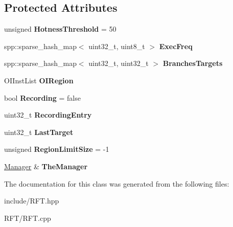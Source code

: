 \subsection*{Protected Attributes}
\begin{DoxyCompactItemize}
\item 
unsigned {\bfseries Hotness\+Threshold} = 50\hypertarget{classdbt_1_1_r_f_t_a03facc8b4254fa669d60ce76577aabb5}{}\label{classdbt_1_1_r_f_t_a03facc8b4254fa669d60ce76577aabb5}

\item 
spp\+::sparse\+\_\+hash\+\_\+map$<$ uint32\+\_\+t, uint8\+\_\+t $>$ {\bfseries Exec\+Freq}\hypertarget{classdbt_1_1_r_f_t_a0002b19ea0428e5b620b700f7d68e6e7}{}\label{classdbt_1_1_r_f_t_a0002b19ea0428e5b620b700f7d68e6e7}

\item 
spp\+::sparse\+\_\+hash\+\_\+map$<$ uint32\+\_\+t, uint32\+\_\+t $>$ {\bfseries Branches\+Targets}\hypertarget{classdbt_1_1_r_f_t_a7554ac4d22167967f3cefca30f7eea32}{}\label{classdbt_1_1_r_f_t_a7554ac4d22167967f3cefca30f7eea32}

\item 
O\+I\+Inst\+List {\bfseries O\+I\+Region}\hypertarget{classdbt_1_1_r_f_t_a343b0402924fbc86768e754bfbee3ade}{}\label{classdbt_1_1_r_f_t_a343b0402924fbc86768e754bfbee3ade}

\item 
bool {\bfseries Recording} = false\hypertarget{classdbt_1_1_r_f_t_a2b40bb36d8fd5f7b383ee7c1108ea604}{}\label{classdbt_1_1_r_f_t_a2b40bb36d8fd5f7b383ee7c1108ea604}

\item 
uint32\+\_\+t {\bfseries Recording\+Entry}\hypertarget{classdbt_1_1_r_f_t_aa64122cac618590fcd7d7ed727956972}{}\label{classdbt_1_1_r_f_t_aa64122cac618590fcd7d7ed727956972}

\item 
uint32\+\_\+t {\bfseries Last\+Target}\hypertarget{classdbt_1_1_r_f_t_aee36a172a40500f952e7278098cca08d}{}\label{classdbt_1_1_r_f_t_aee36a172a40500f952e7278098cca08d}

\item 
unsigned {\bfseries Region\+Limit\+Size} = -\/1\hypertarget{classdbt_1_1_r_f_t_adad85e8e15a66607c9ed15b50e90894c}{}\label{classdbt_1_1_r_f_t_adad85e8e15a66607c9ed15b50e90894c}

\item 
\hyperlink{classdbt_1_1_manager}{Manager} \& {\bfseries The\+Manager}\hypertarget{classdbt_1_1_r_f_t_ad8b0934dbd7cb1e0cdf5992aa84a80fd}{}\label{classdbt_1_1_r_f_t_ad8b0934dbd7cb1e0cdf5992aa84a80fd}

\end{DoxyCompactItemize}


The documentation for this class was generated from the following files\+:\begin{DoxyCompactItemize}
\item 
include/R\+F\+T.\+hpp\item 
R\+F\+T/R\+F\+T.\+cpp\end{DoxyCompactItemize}
